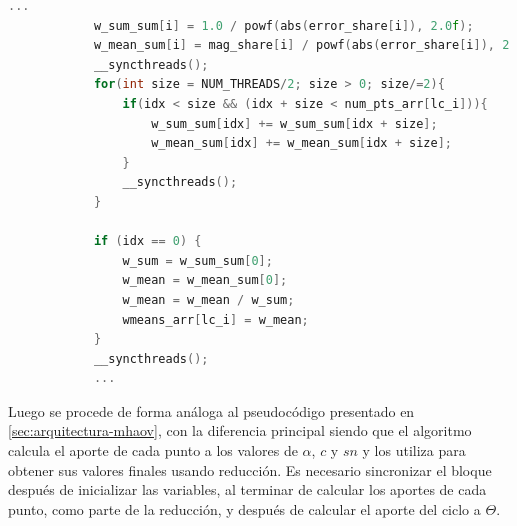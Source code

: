 \begin{lstlisting}[language=C++]
            ...
            w_sum_sum[i] = 1.0 / powf(abs(error_share[i]), 2.0f);
            w_mean_sum[i] = mag_share[i] / powf(abs(error_share[i]), 2.0f); }
            __syncthreads();
            for(int size = NUM_THREADS/2; size > 0; size/=2){
                if(idx < size && (idx + size < num_pts_arr[lc_i])){
                    w_sum_sum[idx] += w_sum_sum[idx + size];
                    w_mean_sum[idx] += w_mean_sum[idx + size];
                }
                __syncthreads();
            }

            if (idx == 0) {
                w_sum = w_sum_sum[0];
                w_mean = w_mean_sum[0];
                w_mean = w_mean / w_sum;
                wmeans_arr[lc_i] = w_mean;
            }
            __syncthreads();
            ...
\end{lstlisting}
Luego se procede de forma análoga al pseudocódigo presentado en \ref{sec:arquitectura-mhaov}, con la diferencia principal siendo que el algoritmo calcula el aporte de cada punto a los valores de $\alpha$, $c$ y $sn$ y los utiliza para obtener sus valores finales usando reducción. Es necesario sincronizar el bloque después de inicializar las variables, al terminar de calcular los aportes de cada punto, como parte de la reducción, y después de calcular el aporte del ciclo a $\Theta$.
